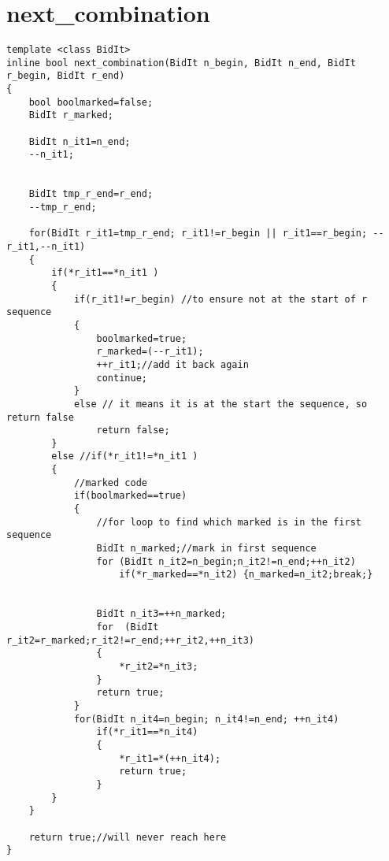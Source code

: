 \section{next\_combination}
\label{app:nextcombination}
\begin{verbatim}
template <class BidIt>
inline bool next_combination(BidIt n_begin, BidIt n_end, BidIt r_begin, BidIt r_end)
{
    bool boolmarked=false;
    BidIt r_marked;

    BidIt n_it1=n_end;
    --n_it1;


    BidIt tmp_r_end=r_end;
    --tmp_r_end;

    for(BidIt r_it1=tmp_r_end; r_it1!=r_begin || r_it1==r_begin; --r_it1,--n_it1)
    {
        if(*r_it1==*n_it1 )
        {
            if(r_it1!=r_begin) //to ensure not at the start of r sequence
            {
                boolmarked=true;
                r_marked=(--r_it1);
                ++r_it1;//add it back again 
                continue;
            }
            else // it means it is at the start the sequence, so return false
                return false;      
        }
        else //if(*r_it1!=*n_it1 )
        {
            //marked code
            if(boolmarked==true)
            {
                //for loop to find which marked is in the first sequence
                BidIt n_marked;//mark in first sequence
                for (BidIt n_it2=n_begin;n_it2!=n_end;++n_it2)
                    if(*r_marked==*n_it2) {n_marked=n_it2;break;}


                BidIt n_it3=++n_marked;    
                for  (BidIt r_it2=r_marked;r_it2!=r_end;++r_it2,++n_it3)
                {
                    *r_it2=*n_it3;
                }
                return true;
            }
            for(BidIt n_it4=n_begin; n_it4!=n_end; ++n_it4)
                if(*r_it1==*n_it4)
                {
                    *r_it1=*(++n_it4);
                    return true;           
                }
        }
    }  

    return true;//will never reach here    
}
\end{verbatim}

